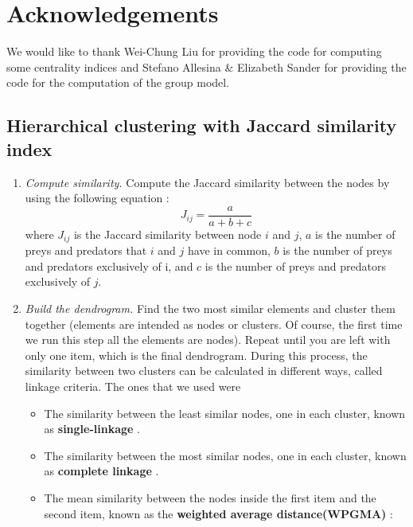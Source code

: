 \documentclass[twocolumn]{article}
\begin{document}
\section*{Acknowledgements}
	We would like to thank Wei-Chung Liu for providing the code for computing some centrality indices and Stefano Allesina \& Elizabeth Sander for providing the code for the  computation of the group model.
	
	
\begin{appendices}
	\section{Hierarchical clustering with Jaccard similarity index}
	\label{appendix:a}
		\begin{enumerate}
			\item \emph{Compute similarity.} \smallskip \newline
						Compute the Jaccard similarity between the nodes by using the following equation \citep{Yodzis1999}:
						\begin{equation}
				      J_{ij}=\frac{a}{a+b+c} \label{eqn:jaccard}
			      \end{equation}
			      where $J_{ij}$ is the Jaccard similarity between node $i$ and $j$, $a$ is the number of preys and predators that $i$ and $j$ have in common, $b$ is the number of preys and predators exclusively of i, and $c$ is the number of preys and predators exclusively of $j$.
			\item \emph{Build the dendrogram.} \smallskip \newline
			      Find the two most similar elements and cluster them together (elements are intended as nodes or clusters. Of course, the first time we run this step all the elements are nodes). Repeat until you are left with only one item, which is the final dendrogram. During this process, the similarity between two clusters can be calculated in different ways, called linkage criteria. The ones that we used were
			      \begin{itemize}
				      \item 	The similarity between the least similar nodes, one in each cluster, known as \textbf{single-linkage} \citep{Frigui2008}.
				      \item 	The similarity between the most similar nodes, one in each cluster, known as \textbf{complete linkage} \citep{Frigui2008}.
				      \item 	The mean similarity between the nodes inside the first item and the second item, known as the \textbf{weighted average distance(WPGMA)} \citep{Sokal1958}:

\end{itemize}
\end{enumerate}
\end{appendices}
\end{document}
